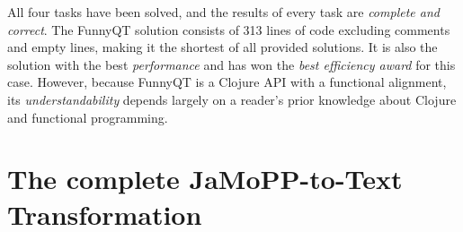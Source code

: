 \documentclass[submission]{eptcs}
\begin{document}
All four tasks have been solved, and the results of every task are
\emph{complete and correct}.  The FunnyQT solution consists of 313 lines of
code excluding comments and empty lines, making it the shortest of all provided
solutions.  It is also the solution with the best \emph{performance} and has
won the \emph{best efficiency award} for this case.  However, because FunnyQT
is a Clojure API with a functional alignment, its \emph{understandability}
depends largely on a reader's prior knowledge about Clojure and functional
programming.






\appendix
\newpage
\section{The complete JaMoPP-to-Text Transformation}
\label{sec:complete-jamopp-text}
\end{document}
